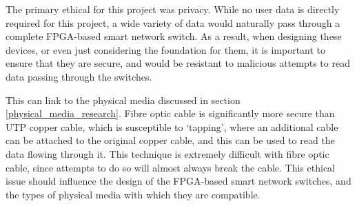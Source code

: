 
The primary ethical for this project was privacy. While no user data is directly required for this project, a wide variety of data would naturally pass through a complete FPGA-based smart network switch.
As a result, when designing these devices, or even just considering the foundation for them, it is important to ensure that they are secure, and would be resistant to malicious attempts to read data passing through the switches.

This can link to the physical media discussed in section \ref{physical_media_research}. Fibre optic cable is significantly more secure than UTP copper cable, which is susceptible to `tapping', where an additional cable can be attached to the original copper cable, and this can be used to read the data flowing through it. This technique is extremely difficult with fibre optic cable, since attempts to do so will almost always break the cable.
This ethical issue should influence the design of the FPGA-based smart network switches, and the types of physical media with which they are compatible.
